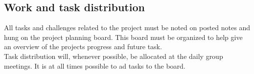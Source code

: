 \subsection{Work and task distribution}
All tasks and challenges related to the project must be noted on posted notes and hung on the project planning board. This board must be organized to help give an overview of the projects progress and future task.\\
Task distribution will, whenever possible, be allocated at the daily group meetings. It is at all times possible to ad tasks to the board.\\
\subsection{}
